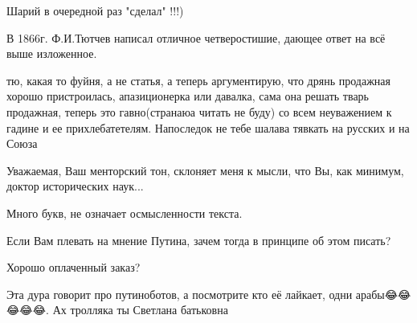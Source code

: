 \begin{itemize}
 
Шарий в очередной раз "сделал" !!!)

 
В 1866г. Ф.И.Тютчев написал отличное четверостишие, дающее ответ на всё выше изложенное.

 
тю, какая то фуйня, а не статья, а теперь аргументирую, что дрянь продажная хорошо пристроилась, апазиционерка или давалка, сама она решать тварь продажная, теперь это гавно(странаюа читать не буду) со всем неуважением к гадине и ее прихлебатетелям. Напоследок не тебе шалава тявкать на русских и на Союза

 

Уважаемая, Ваш менторский тон, склоняет меня к мысли, что Вы, как минимум, доктор исторических наук...

Много букв, не означает осмысленности текста.

Если Вам плевать на мнение Путина, зачем тогда в принципе об этом писать?

Хорошо оплаченный заказ?

 
Эта дура говорит про путиноботов, а посмотрите кто её лайкает, одни арабы😂😂😂😂😂. Ах тролляка ты Светлана батьковна

\begin{itemize}
 

\end{itemize}
\end{itemize}
